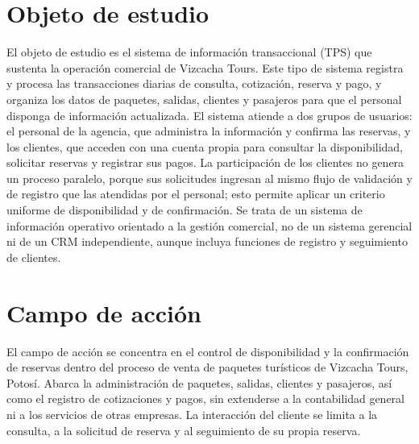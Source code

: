 \label{cap:objeto}

\section*{Objeto de estudio}

El objeto de estudio es el sistema de información transaccional (TPS) que
sustenta la operación comercial de Vizcacha Tours. Este tipo de sistema
registra y procesa las transacciones diarias de consulta, cotización, reserva
y pago, y organiza los datos de paquetes, salidas, clientes y pasajeros para
que el personal disponga de información actualizada. El sistema atiende a dos
grupos de usuarios: el personal de la agencia, que administra la información y
confirma las reservas, y los clientes, que acceden con una cuenta propia para
consultar la disponibilidad, solicitar reservas y registrar sus pagos. La
participación de los clientes no genera un proceso paralelo, porque sus
solicitudes ingresan al mismo flujo de validación y de registro que las
atendidas por el personal; esto permite aplicar un criterio uniforme de
disponibilidad y de confirmación. Se trata de un sistema de información
operativo orientado a la gestión comercial, no de un sistema gerencial ni de
un CRM independiente, aunque incluya funciones de registro y seguimiento de
clientes.

\section*{Campo de acción}

El campo de acción se concentra en el control de disponibilidad y la
confirmación de reservas dentro del proceso de venta de paquetes turísticos de
Vizcacha Tours, Potosí. Abarca la administración de paquetes, salidas,
clientes y pasajeros, así como el registro de cotizaciones y pagos, sin
extenderse a la contabilidad general ni a los servicios de otras empresas. La
interacción del cliente se limita a la consulta, a la solicitud de reserva y al
seguimiento de su propia reserva.
